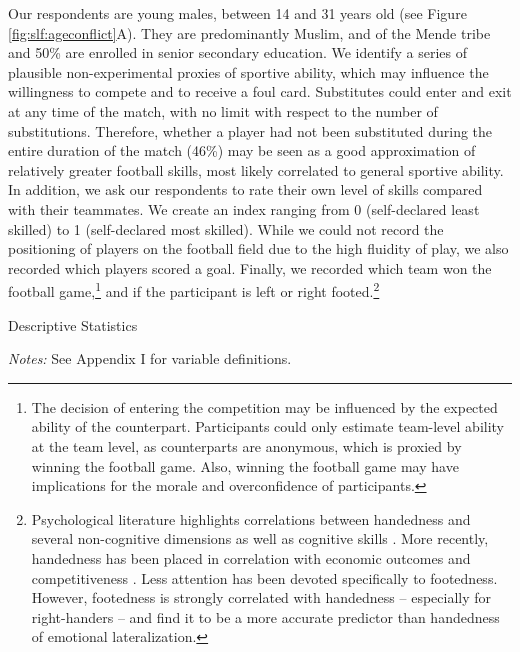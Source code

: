 Our respondents are young males, between 14 and 31 years old (see Figure \ref{fig:slf:ageconflict}A). They are predominantly Muslim, and of the Mende tribe and 50\% are enrolled in senior secondary education. We identify a series of plausible non-experimental proxies of sportive ability, which may influence the willingness to compete and to receive a foul card. Substitutes could enter and exit at any time of the match, with no limit with respect to the number of substitutions. Therefore, whether a player had not been substituted during the entire duration of the match (46\%) may be seen as a good approximation of relatively greater football skills, most likely correlated to general sportive ability. In addition, we ask our respondents to rate their own level of skills compared with their teammates. We create an index ranging from 0 (self-declared least skilled) to 1 (self-declared most skilled). While we could not record the positioning of players on the football field due to the high fluidity of play, we also recorded which players scored a goal. Finally, we recorded which team won the football game,\footnote{The decision of entering the competition may be influenced by the expected ability of the counterpart. Participants could only estimate team-level ability at the team level, as counterparts are anonymous, which is proxied by winning the football game. Also, winning the football game may have implications for the morale and overconfidence of participants.}  and if the participant is left or right footed.\footnote{Psychological literature highlights correlations between handedness and several non-cognitive dimensions \citep{Goldberg1994} as well as cognitive skills \citep{Sanders1982,Faurie2006}. More recently, handedness has been placed in correlation with economic outcomes \citep{Denny2007} and competitiveness \citep{Hoffman2010}. Less attention has been devoted specifically to footedness. However, footedness is strongly correlated with handedness – especially for right-handers \citep{Peters1979} – and \citet{Elias1998} find it to be a more accurate predictor than handedness of emotional lateralization.}

\clearpage 

\begin{threeparttable}[p!]
	\caption{Descriptive Statistics}
	\label{tab:slf:summstats}
	\centering
	
	\begin{tablenotes}
		\item \textit{Notes:} See Appendix I for variable definitions.
	\end{tablenotes}
\end{threeparttable}

